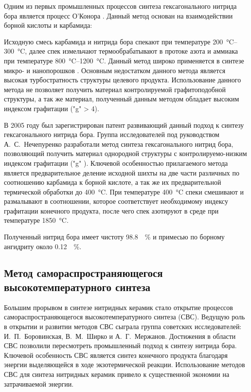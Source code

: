 Одним из первых промышленных процессов синтеза гексагонального нитрида бора является
процесс О'Конора \cite[]{edmond_process_1966}. Данный метод основан на взаимодействии 
борной кислоты и карбамида:


Исходную смесь карбамида и нитрида бора спекают при температуре 
\SIrange{200}{300}{\degreeCelsius}, далее спек измельчают термообрабатывают в протоке 
азота и аммиака при температуре \SIrange{800}{1200}{\degreeCelsius}. Данный метод
широко применяется в синтезе микро- и нанопорошков . Основным недостатком
данного метода является высокая турбостратность структуры целевого продукта.
Использование данного метода не позволяет получить материал контролируемой 
графитоподобной структуры, а так же материал, полученный данным методом 
обладает высоким индексом графитации ("g" > 4).  


В 2005 году был зарегистрирован патент \cite[]{_ru__2005} развивающий данный 
подход к синтезу гексагонального нитрида бора. Группа исследователей под
руководством А.~С.~Нечепуренко разработали метод синтеза гексагонального нитрид
бора, позволяющий получить материал однородной структуры с контролируемо-низким
индексом графитации ("g" ). Ключевой особенностью прилагаемого метода
является предварительное деление исходной шихты  на две части 
различных по соотношению карбамида к борной кислоте, а так же их предварительной
термической обработки до \SI{400}{\degreeCelsius}. При температуре \SI{400}{\degreeCelsius}
спеки смешивают и размалывают в соотношении, которое соответствует необходимому 
индексу графитации конечного продукта, после чего спек азотируют в среде 
при температуре \SI{1850}{\degreeCelsius}.

Полученный нитрид бора имеет чистоту \SI{98.8}{\%} и примесью по 
борному ангидриту около \SI{0.12}{\%}.

\subsection{Метод самораспространяющегося высокотемпературного синтеза}%
\label{sub:Метод самораспространяющегося высокотемпературного синтеза}

Большим прорывом в синтезе нитридных керамик стало открытие процессов
самораспространяющегося высокотемпературного синтеза (СВС). Ведущую роль
в открытии и развитии методов СВС сыграла группа советских
исследователей: И.~П.~Боровинская, В.~М.~Ширко и А.~Г.~Мержанов. Достижения
в области СВС позволили пересмотреть промышленный подход к синтезу нитрида
бора. Ключевой особенность СВС является синтез конечного продукта благодаря
энергии выделяющейся в ходе экзотермической реакции. Использование методов 
СВС для синтеза нитридных керамик привело к существенной экономии на затрачиваемой
энергии.

